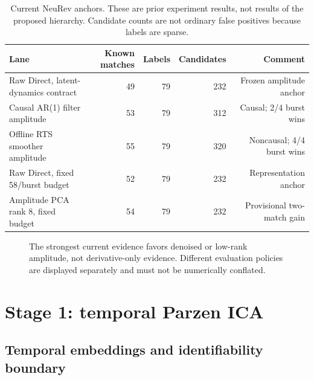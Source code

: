 \documentclass[11pt]{article}
\begin{document}
\begin{table}[H]
\centering
\caption{Current NeuRev anchors. These are prior experiment results, not results
of the proposed hierarchy. Candidate counts are not ordinary false positives
because labels are sparse.}
\label{tab:anchors}
\begin{tabularx}{\textwidth}{>{\raggedright\arraybackslash}Xrrrr}
\toprule
Lane & Known matches & Labels & Candidates & Comment \\
\midrule
Raw Direct, latent-dynamics contract & 49 & 79 & 232 & Frozen amplitude anchor \\
Causal AR(1) filter amplitude & 53 & 79 & 312 & Causal; 2/4 burst wins \\
Offline RTS smoother amplitude & 55 & 79 & 320 & Noncausal; 4/4 burst wins \\
Raw Direct, fixed 58/burst budget & 52 & 79 & 232 & Representation anchor \\
Amplitude PCA rank 8, fixed budget & 54 & 79 & 232 & Provisional two-match gain \\
\bottomrule
\end{tabularx}
\end{table}

\begin{figure}[H]
\centering
{}
\caption{The strongest current evidence favors denoised or low-rank amplitude,
not derivative-only evidence. Different evaluation policies are displayed
separately and must not be numerically conflated.}
\label{fig:anchors}
\end{figure}

\section{Stage 1: temporal Parzen ICA}

\subsection{Temporal embeddings and identifiability boundary}
\end{document}
